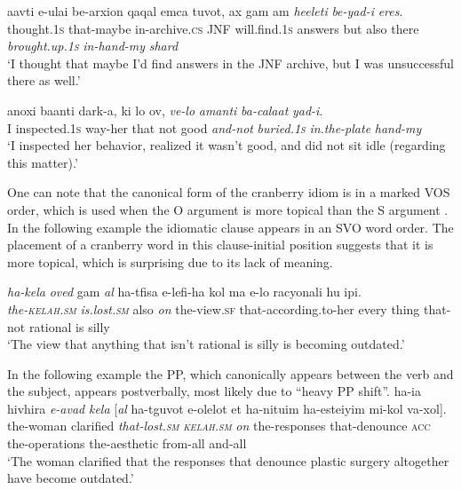 \documentclass[output=paper]{langsci/langscibook}
\begin{document}
	\ea\label{she:xeres-order}
    	\gll {\het}a{\shin}avti {\shin}e-{\alef}ulai be-{\alef}arxion qaqal {\alef}emca t{\shin}uvot, {\alef}ax gam {\shin}am \textit{he{\ayin}eleti} \textit{be-yad-i} \textit{{\het}eres}.\\
    	   thought.\textsc{1s} that-maybe in-archive.\textsc{cs} JNF will.find.\textsc{1s} answers but also there \textit{brought.up.\textsc{1s}} \textit{in-hand-my} \textit{shard}\\
    	\glt `I thought that maybe I'd find answers in the JNF archive, but I was unsuccessful there as well.'
	\z

	\ea\label{she:taman-order}
    	\gll {\alef}anoxi ba{\het}anti dark-a, ki lo {\tet}ov, \textit{ve-lo} \textit{{\tet}amanti} \textit{ba-cala{\het}at} \textit{yad-i}.\\
    	   I inspected.\textsc{1s} way-her that not good \textit{and-not} \textit{buried.\textsc{1s}} \textit{in.the-plate} \textit{hand-my}\\
    	\glt `I inspected her behavior, realized it wasn't good, and did not sit idle (regarding this matter).'
	\z

One can note that the canonical form of the cranberry idiom  is in a marked VOS order, which is used when the O argument is more topical than the S argument \citep{melnik16}. In the following example the idiomatic clause appears in an SVO word order. The placement of a cranberry word in this clause-initial position suggests that it is more topical, which is surprising due to its lack of meaning.

    \ea\label{she:kelax-top}
         \gll \textit{ha-kela{\het}} \textit{{\alef}oved} gam \textit{{\ayin}al} ha-tfisa {\shin}e-lefi-ha kol ma {\shin}e-lo racyonali hu {\tet}ip{\shin}i.\\
             \textit{the-\textsc{kelah}.\textsc{sm}} \textit{is.lost.\textsc{sm}} also \textit{on} the-view.\textsc{sf} that-according.to-her every thing that-not rational is silly\\
        \glt `The view that anything that isn't rational is silly is becoming outdated.'
    \z


In the following example the PP, which canonically appears between the verb and the subject, appears postverbally, most likely due to ``heavy PP shift''.
    \ea\label{she:kelax-order}
        \gll ha-{\alef}i{\shin}a hivhira \textit{{\shin}e-{\alef}avad} \textit{kela{\het}} \textnormal{[}\textit{{\ayin}al} ha-tguvot {\shin}e-{\shin}olelot {\alef}et ha-nitu{\het}im ha-{\alef}este{\tet}iyim mi-kol va-xol\textnormal{]}.\\
            the-woman clarified \textit{that-lost.\textsc{sm}} \textit{\textsc{kelah}.\textsc{sm}} \textit{on} the-responses that-denounce \textsc{acc} the-operations the-aesthetic from-all and-all\\
        \glt `The woman clarified that the responses that denounce plastic surgery altogether have become outdated.'
    \z
\end{document}
